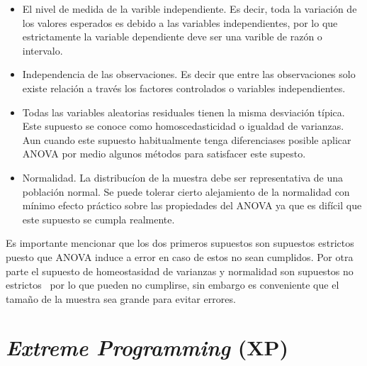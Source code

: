 \begin{itemize}

\item El nivel de medida de la varible independiente. Es decir, toda la variación de los valores esperados es debido a las variables independientes, por lo que estrictamente la variable dependiente deve ser una varible de razón o intervalo. 

\item Independencia de las observaciones. Es decir que entre las observaciones solo existe relación a través los factores controlados o variables independientes. 

\item Todas las variables aleatorias residuales tienen la misma desviación típica. Este supuesto se conoce como homoscedasticidad o igualdad de varianzas. Aun cuando este supuesto habitualmente tenga diferenciases posible aplicar ANOVA por medio algunos métodos para satisfacer este supesto.

\item Normalidad. La distribucíon de la muestra debe ser representativa de una población normal. Se puede tolerar cierto alejamiento de la normalidad con mínimo efecto práctico sobre las propiedades del ANOVA ya que es difícil que este supuesto se cumpla realmente.

\end{itemize}

Es importante mencionar que los dos primeros supuestos son supuestos estrictos puesto que ANOVA induce a error en caso de estos no sean cumplidos. Por otra parte el supuesto de homeostasidad de varianzas y normalidad son supuestos no estrictos~\citep{seco2010analisis} por lo que pueden no cumplirse, sin embargo es conveniente que el tamaño de la muestra sea grande para evitar errores.

\section{\textit{Extreme Programming} (XP)}
\label{preliminares:xp}

